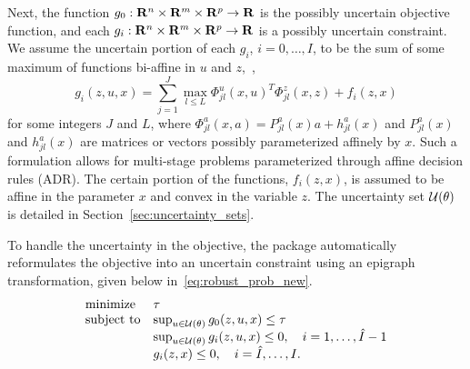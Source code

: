 Next, the function $g_0:  {\mathbf R}^n \times {\mathbf R}^m \times {\mathbf R}^{p} \to {\mathbf R}$ is the possibly uncertain objective function, and each $g_i : {\mathbf R}^n \times {\mathbf R}^m \times {\mathbf R}^{p} \to {\mathbf R}$ is a possibly uncertain constraint. We assume the uncertain portion of each $g_i$, $i=0,\dots,I$, to be the sum of some maximum of functions bi-affine in $u$ and $z$,~\eg, 
\begin{equation}
\label{eq:sum_max_affine}
    g_i(z, u, x) = \sum_{j=1}^J\max_{l\leq L} \Phi_{jl}^u(x,u)^T\Phi_{jl}^z(x,z)+ f_i(z,x)
\end{equation} 
for some integers $J$ and $L$, where $\Phi_{jl}^a(x,a) = P_{jl}^a(x)a + h^a_{jl}(x)$ and $P_{jl}^a(x)$ and $h_{jl}^a(x)$ are matrices or vectors possibly parameterized affinely by $x$. 
Such a formulation allows for multi-stage problems parameterized through affine decision rules (ADR). 
The certain portion of the functions, $f_i(z,x)$, is assumed to be affine in the parameter $x$ and convex in the variable $z$.  
The uncertainty set ${\mathcal{U}}(\theta)$ is detailed in Section~\ref{sec:uncertainty_sets}.

To handle the uncertainty in the objective, the package automatically reformulates the objective into an uncertain constraint using an epigraph transformation, given below in~\eqref{eq:robust_prob_new}.
\begin{equation}
	\label{eq:robust_prob_new}
         \begin{array}[t]{ll}
		\mbox{minimize}  & \tau \\
		\mbox{subject to} & \sup_{u \in {\mathcal{U}}(\theta)} g_0(z,u,x)\leq \tau \\
        & \sup_{u \in {\mathcal{U}}(\theta)} g_i(z,u,x)  \le 0,  \quad i = 1,\dots,\hat{I}-1\\
        &g_i(z,x)  \le 0,  \quad i = \hat{I},\dots,I.
	\end{array}
\end{equation}

